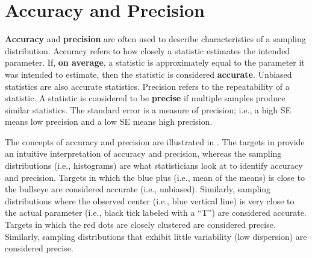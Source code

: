 \documentclass[10pt,openany]{book}\usepackage[]{graphicx}\usepackage[]{color}
\begin{document}
\section{Accuracy and Precision}
\vspace{-12pt}
\textbf{Accuracy} and \textbf{precision} are often used to describe characteristics of a sampling distribution.  Accuracy refers to how closely a statistic estimates the intended parameter.  If, \textbf{on average}, a statistic is approximately equal to the parameter it was intended to estimate, then the statistic is considered \textbf{accurate}.  Unbiased statistics are also accurate statistics.  Precision refers to the repeatability of a statistic.  A statistic is considered to be \textbf{precise} if multiple samples produce similar statistics.  The standard error is a measure of precision; i.e., a high SE means low precision and a low SE means high precision.

The concepts of accuracy and precision are illustrated in .  The targets in  provide an intuitive interpretation of accuracy and precision, whereas the sampling distributions (i.e., histograms) are what statisticians look at to identify accuracy and precision.  Targets in which the blue plus (i.e., mean of the means) is close to the bullseye are considered accurate (i.e., unbiased).  Similarly, sampling distributions where the observed center (i.e., blue vertical line) is very close to the actual parameter (i.e., black tick labeled with a ``T'') are considered accurate.  Targets in which the red dots are closely clustered are considered precise.  Similarly, sampling distributions that exhibit little variability (low dispersion) are considered precise.
\end{document}
